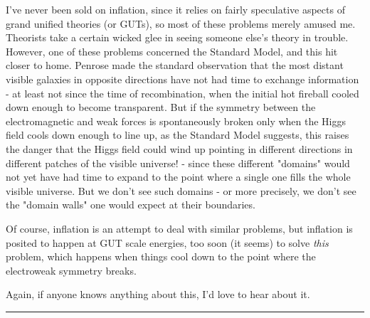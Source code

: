 I've never been sold on inflation, since it relies on fairly speculative
aspects of grand unified theories (or GUTs), so most of these problems merely 
amused me.  Theorists take a certain wicked glee in seeing someone else's 
theory in trouble.  However, one of these problems concerned the Standard 
Model, and this hit closer to home.  Penrose made the standard observation 
that the most distant visible galaxies in opposite directions have not had 
time to exchange information - at least not since the time of recombination, 
when the initial hot fireball cooled down enough to become transparent.  
But if the symmetry between the electromagnetic and weak forces is 
spontaneously broken only when the Higgs field cools down enough to line 
up, as the Standard Model suggests, this raises the danger that the Higgs 
field could wind up pointing in different directions in different patches 
of the visible universe! - since these different "domains" would not yet 
have had time to expand to the point where a single one fills the whole 
visible universe.  But we don't see such domains - or more precisely, we 
don't see the "domain walls" one would expect at their boundaries.  

Of course, inflation is an attempt to deal with similar problems, but 
inflation is posited to happen at GUT scale energies, too soon (it seems)
to solve \emph{this} problem, which happens when things cool down to the 
point where the electroweak symmetry breaks.  

Again, if anyone knows anything about this, I'd love to hear about it.


 \par\noindent\rule{\textwidth}{0.4pt}

